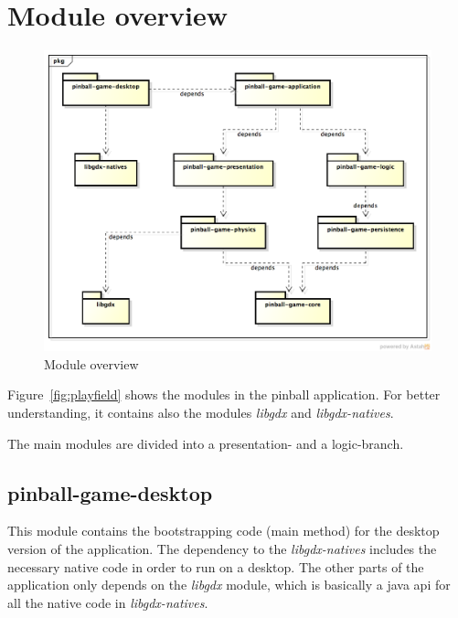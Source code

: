 \documentclass[fontsize=12pt,
               paper=a4,
               twoside=false,
               parskip=half,
               ]{scrartcl}
\begin{document}
\newcommand{\doctitle}{Design Model}
	

\tableofcontents

\section{Module overview}

\begin{figure}[h!]
	\centering
	\includegraphics[width=15.5cm]{./img/package-overview.png}
	\caption[Module overview]{Module overview}
	\label{fig:moduel_overview}
\end{figure}

Figure~\ref{fig:playfield} shows the modules in the pinball application. For better understanding, it contains also the modules \emph{libgdx} and \emph{libgdx-natives}.

The main modules are divided into a presentation- and a logic-branch.

\subsection{pinball-game-desktop}

This module contains the bootstrapping code (main method) for the desktop version of the application. The dependency to the \emph{libgdx-natives} includes the necessary native code in order to run on a desktop. The other parts of the application only depends on the \emph{libgdx} module, which is basically a java api for all the native code in \emph{libgdx-natives}.
\end{document}
